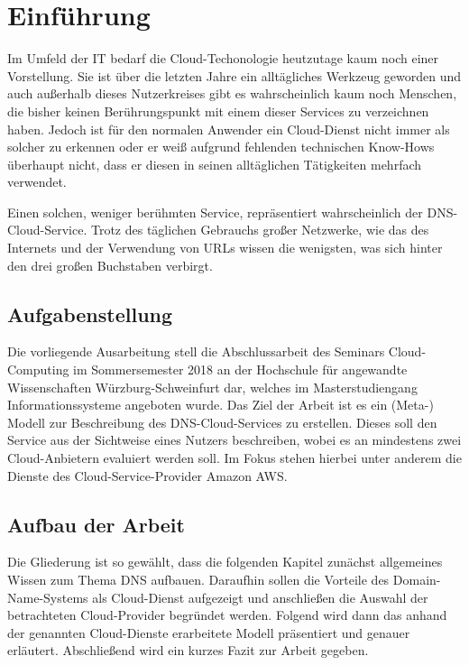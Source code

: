 \section{Einführung}
Im Umfeld der IT bedarf die Cloud-Techonologie heutzutage kaum noch einer Vorstellung. Sie ist über die letzten Jahre ein alltägliches Werkzeug geworden und auch außerhalb dieses Nutzerkreises gibt es wahrscheinlich kaum noch Menschen, die bisher keinen Berührungspunkt mit einem dieser Services zu verzeichnen haben. Jedoch ist für den normalen Anwender ein Cloud-Dienst nicht immer als solcher zu erkennen oder er weiß aufgrund fehlenden technischen Know-Hows überhaupt nicht, dass er diesen in seinen alltäglichen Tätigkeiten mehrfach verwendet.

Einen solchen, weniger berühmten Service, repräsentiert wahrscheinlich der DNS-Cloud-Service. Trotz des täglichen Gebrauchs großer Netzwerke, wie das des Internets und der Verwendung von URLs wissen die wenigsten, was sich hinter den drei großen Buchstaben verbirgt.

\subsection{Aufgabenstellung}
Die vorliegende Ausarbeitung stell die Abschlussarbeit des Seminars Cloud-Computing im Sommersemester 2018 an der Hochschule für angewandte Wissenschaften Würzburg-Schweinfurt dar, welches im Masterstudiengang Informationssysteme angeboten wurde. Das Ziel der Arbeit ist es  ein (Meta-) Modell zur Beschreibung des DNS-Cloud-Services zu erstellen. Dieses soll den Service aus der Sichtweise eines Nutzers beschreiben, wobei es an mindestens zwei Cloud-Anbietern evaluiert werden soll. Im Fokus stehen hierbei unter anderem die Dienste des Cloud-Service-Provider Amazon AWS.

\subsection{Aufbau der Arbeit}
Die Gliederung ist so gewählt, dass die folgenden Kapitel zunächst allgemeines Wissen zum Thema DNS aufbauen. Daraufhin sollen die Vorteile des Domain-Name-Systems als Cloud-Dienst aufgezeigt und anschließen die Auswahl der betrachteten Cloud-Provider begründet werden. Folgend wird dann das anhand der genannten Cloud-Dienste erarbeitete Modell präsentiert und genauer erläutert. Abschließend wird ein kurzes Fazit zur Arbeit gegeben.
